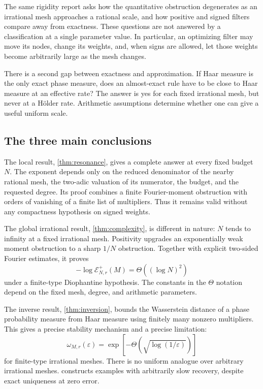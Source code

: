 \documentclass[11pt,a4paper]{article}
\numberwithin{equation}{section}
\theoremstyle{plain}
\theoremstyle{definition}
\theoremstyle{remark}
\newcommand{\Err}{\mathcal E}
\begin{document}
The same rigidity report asks how the quantitative obstruction degenerates
as an irrational mesh approaches a rational scale, and how positive and signed
filters compare away from exactness. These questions are not answered by a
classification at a single parameter value. In particular, an optimizing
filter may move its nodes, change its weights, and, when signs are allowed,
let those weights become arbitrarily large as the mesh changes.

There is a second gap between exactness and approximation. If Haar measure is
the only exact phase measure, does an almost-exact rule have to be close to
Haar measure at an effective rate? The answer is yes for each fixed irrational
mesh, but never at a H\"older rate. Arithmetic assumptions determine whether
one can give a useful uniform scale.

\subsection{The three main conclusions}

The local result, \cref{thm:resonance}, gives a complete answer at every fixed
budget $N$. The exponent depends only on the reduced denominator of the nearby
rational mesh, the two-adic valuation of its numerator, the budget, and the
requested degree. Its proof combines a finite Fourier-moment obstruction with
orders of vanishing of a finite list of multipliers. Thus it remains valid
without any compactness hypothesis on signed weights.

The global irrational result, \cref{thm:complexity}, is different in nature:
$N$ tends to infinity at a fixed irrational mesh. Positivity upgrades an
exponentially weak moment obstruction to a sharp $1/N$ obstruction. Together
with explicit two-sided Fourier estimates, it proves
\begin{equation}\label{eq:scale-intro}
 -\log\Err^+_{N,r}(M)=\Theta((\log N)^2)
\end{equation}
under a finite-type Diophantine hypothesis. The constants in the $\Theta$
notation depend on the fixed mesh, degree, and arithmetic parameters.

The inverse result, \cref{thm:inversion}, bounds the Wasserstein distance of a
phase probability measure from Haar measure using finitely many nonzero
multipliers. This gives a precise stability mechanism and a precise limitation:
\begin{equation}\label{eq:modulus-intro}
 \omega_{M,r}(\varepsilon)
 =\exp[-\Theta(\sqrt{\log(1/\varepsilon)})]
\end{equation}
for finite-type irrational meshes. There is no uniform analogue over arbitrary
irrational meshes.  constructs examples with arbitrarily
slow recovery, despite exact uniqueness at zero error.
\end{document}
